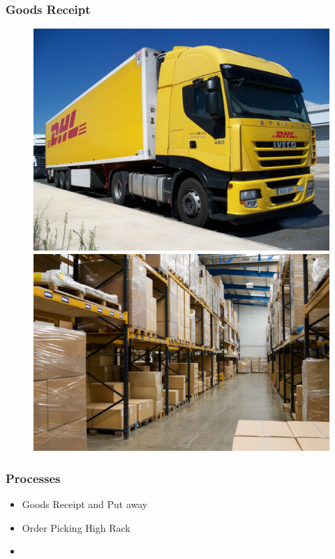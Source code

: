 \begin{frame}\frametitle{Goods Receipt}
	\begin{figure}
		\begin{minipage}{0.45\linewidth}
			\centering
			\includegraphics[width=.95\linewidth,left]{images/Trailer_DHL_2}
		\end{minipage}
		\begin{minipage}{0.45\linewidth}
			\centering
			\includegraphics[width=.95\linewidth,right]{images/bigstock-Industrial-Warehouse-6200839}
		\end{minipage}
	\end{figure}
\end{frame}
\begin{frame}\frametitle{Processes}
	\begin{itemize}
		\item Goods Receipt and Put away
		\item Order Picking High Rack
		\item[]
	\end{itemize}
\end{frame}
